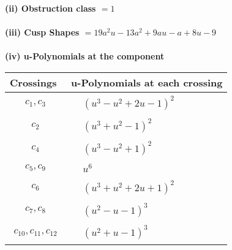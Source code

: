 \documentclass[1p]{elsarticle_modified}
\theoremstyle{definition}
\begin{document}
\flushleft \textbf{(ii) Obstruction class $= 1$}\\~\\
\flushleft \textbf{(iii) Cusp Shapes $= 19 a^2 u-13 a^2+9 a u- a+8 u-9$}\\~\\
\newpage\renewcommand{\arraystretch}{1}
\flushleft \textbf{(iv) u-Polynomials at the component}\newline \\
\begin{tabular}{m{50pt}|m{274pt}}
Crossings & \hspace{64pt}u-Polynomials at each crossing \\
\hline $$\begin{aligned}c_{1},c_{3}\end{aligned}$$&$\begin{aligned}
&(u^3- u^2+2 u-1)^2
\end{aligned}$\\
\hline $$\begin{aligned}c_{2}\end{aligned}$$&$\begin{aligned}
&(u^3+u^2-1)^2
\end{aligned}$\\
\hline $$\begin{aligned}c_{4}\end{aligned}$$&$\begin{aligned}
&(u^3- u^2+1)^2
\end{aligned}$\\
\hline $$\begin{aligned}c_{5},c_{9}\end{aligned}$$&$\begin{aligned}
&u^6
\end{aligned}$\\
\hline $$\begin{aligned}c_{6}\end{aligned}$$&$\begin{aligned}
&(u^3+u^2+2 u+1)^2
\end{aligned}$\\
\hline $$\begin{aligned}c_{7},c_{8}\end{aligned}$$&$\begin{aligned}
&(u^2- u-1)^3
\end{aligned}$\\
\hline $$\begin{aligned}c_{10},c_{11},c_{12}\end{aligned}$$&$\begin{aligned}
&(u^2+u-1)^3
\end{aligned}$\\
\hline
\end{tabular}\\~\\
\end{document}
